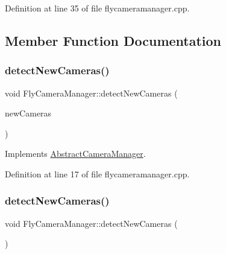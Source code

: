 Definition at line 35 of file flycameramanager.\+cpp.



\subsection{Member Function Documentation}
\mbox{\label{class_fly_camera_manager_aab72966a50baaf966817c7f1265341a8}} 
\subsubsection{\texorpdfstring{detectNewCameras()}{detectNewCameras()}\hspace{0.1cm}{\footnotesize\ttfamily [1/2]}}
{\footnotesize\ttfamily void Fly\+Camera\+Manager\+::detect\+New\+Cameras (\begin{DoxyParamCaption}\item[{std\+::vector$<$ \mbox{\hyperlink{class_abstract_camera}{Abstract\+Camera}} $\ast$ $>$ $\ast$}]{new\+Cameras }\end{DoxyParamCaption})\hspace{0.3cm}{\ttfamily [virtual]}}



Implements \mbox{\hyperlink{class_abstract_camera_manager_a8e215b2531fd8c18551382dc8f571817}{Abstract\+Camera\+Manager}}.



Definition at line 17 of file flycameramanager.\+cpp.

\mbox{\label{class_fly_camera_manager_a0f2138fb094303db2da4b8dee7f1fba8}} 
\subsubsection{\texorpdfstring{detectNewCameras()}{detectNewCameras()}\hspace{0.1cm}{\footnotesize\ttfamily [2/2]}}
{\footnotesize\ttfamily void Fly\+Camera\+Manager\+::detect\+New\+Cameras (\begin{DoxyParamCaption}{ }\end{DoxyParamCaption})\hspace{0.3cm}{\ttfamily [virtual]}}



